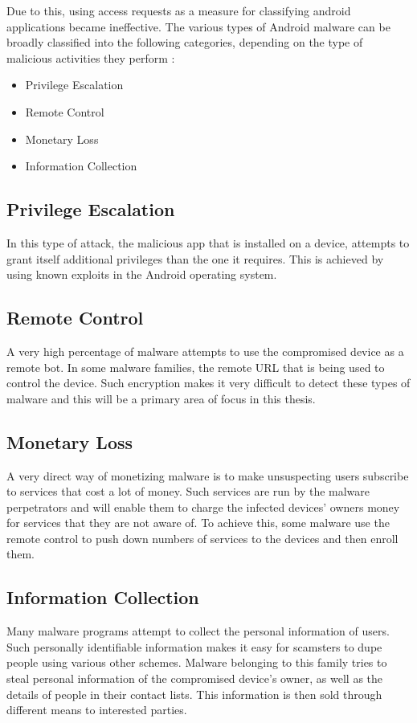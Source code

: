 Due to this, using access requests as a measure for classifying android applications became ineffective. The various types of Android malware can be broadly classified into the following categories, depending on the type of malicious activities they perform \cite{zhou}:

\begin{itemize}
	\item Privilege Escalation
	\item Remote Control
	\item Monetary Loss
	\item Information Collection
\end{itemize}

\subsection{Privilege Escalation}
In this type of attack, the malicious app that is installed on a device, attempts to grant itself additional privileges than the one it requires. This is achieved by using known exploits in the Android operating system.
\subsection{Remote Control}
A very high percentage of malware attempts to use the compromised device as a remote bot. In some malware families, the remote URL that is being used to control the device. Such encryption makes it very difficult to detect these types of malware and this will be a primary area of focus in this thesis.
\subsection{Monetary Loss}
A very direct way of monetizing malware is to make unsuspecting users subscribe to services that cost a lot of money. Such services are run by the malware perpetrators and will enable them to charge the infected devices' owners money for services that they are not aware of. To achieve this, some malware use the remote control to push down numbers of services to the devices and then enroll them.
\subsection{Information Collection}
Many malware programs attempt to collect the personal information of users. Such personally identifiable information makes it easy for scamsters to dupe people using various other schemes. Malware belonging to this family tries to steal personal information of the compromised device's owner, as well as the details of people in their contact lists. This information is then sold through different means to interested parties.

